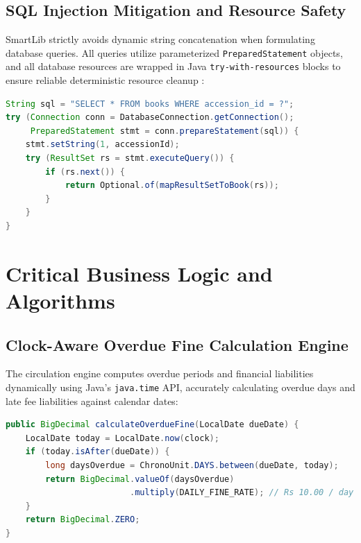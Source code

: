 \subsection{SQL Injection Mitigation and Resource Safety}
SmartLib strictly avoids dynamic string concatenation when formulating database queries. All queries utilize parameterized \texttt{PreparedStatement} objects, and all database resources are wrapped in Java \texttt{try-with-resources} blocks to ensure reliable deterministic resource cleanup \cite{oracle2021jdbc}:
\begin{lstlisting}[language=Java, caption={Defensive JDBC Operation in BookDAOImpl}]
String sql = "SELECT * FROM books WHERE accession_id = ?";
try (Connection conn = DatabaseConnection.getConnection();
     PreparedStatement stmt = conn.prepareStatement(sql)) {
    stmt.setString(1, accessionId);
    try (ResultSet rs = stmt.executeQuery()) {
        if (rs.next()) {
            return Optional.of(mapResultSetToBook(rs));
        }
    }
}
\end{lstlisting}

\section{Critical Business Logic and Algorithms}

\subsection{Clock-Aware Overdue Fine Calculation Engine}
The circulation engine computes overdue periods and financial liabilities dynamically using Java's \texttt{java.time} API, accurately calculating overdue days and late fee liabilities against calendar dates:
\begin{lstlisting}[language=Java, caption={Clock-Aware Fine Calculation Engine}]
public BigDecimal calculateOverdueFine(LocalDate dueDate) {
    LocalDate today = LocalDate.now(clock);
    if (today.isAfter(dueDate)) {
        long daysOverdue = ChronoUnit.DAYS.between(dueDate, today);
        return BigDecimal.valueOf(daysOverdue)
                         .multiply(DAILY_FINE_RATE); // Rs 10.00 / day
    }
    return BigDecimal.ZERO;
}
\end{lstlisting}


